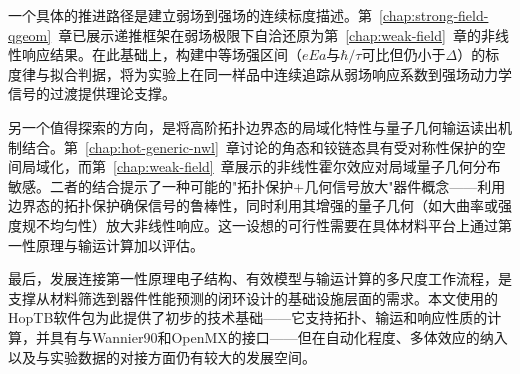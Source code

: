 一个具体的推进路径是建立弱场到强场的连续标度描述。第~\ref{chap:strong-field-qgeom}~章已展示递推框架在弱场极限下自洽还原为第~\ref{chap:weak-field}~章的非线性响应结果。在此基础上，构建中等场强区间（$eEa$与$\hbar/\tau$可比但仍小于$\Delta$）的标度律与拟合判据，将为实验上在同一样品中连续追踪从弱场响应系数到强场动力学信号的过渡提供理论支撑。

另一个值得探索的方向，是将高阶拓扑边界态的局域化特性与量子几何输运读出机制结合。第~\ref{chap:hot-generic-nwl}~章讨论的角态和铰链态具有受对称性保护的空间局域化，而第~\ref{chap:weak-field}~章展示的非线性霍尔效应对局域量子几何分布敏感。二者的结合提示了一种可能的"拓扑保护+几何信号放大"器件概念——利用边界态的拓扑保护确保信号的鲁棒性，同时利用其增强的量子几何（如大曲率或强度规不均匀性）放大非线性响应。这一设想的可行性需要在具体材料平台上通过第一性原理与输运计算加以评估。

最后，发展连接第一性原理电子结构、有效模型与输运计算的多尺度工作流程，是支撑从材料筛选到器件性能预测的闭环设计的基础设施层面的需求。本文使用的HopTB\cite{HopTB}软件包为此提供了初步的技术基础——它支持拓扑、输运和响应性质的计算，并具有与Wannier90\cite{Wannier90v2}和OpenMX\cite{Openmx2003,Openmx2004}的接口——但在自动化程度、多体效应的纳入以及与实验数据的对接方面仍有较大的发展空间。
